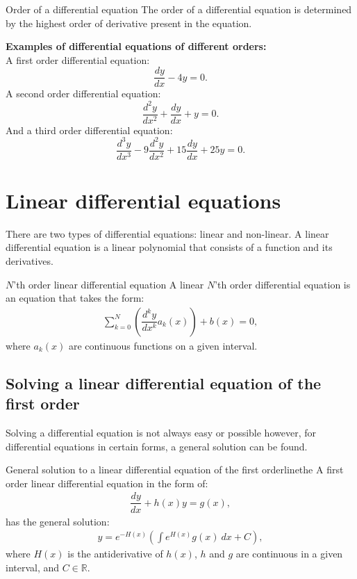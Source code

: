 \clearpage

\begin{definition}{Order of a differential equation}{}
The order of a differential equation is determined by the highest order of derivative present in the equation.
\end{definition} 

\noindent
\textbf{Examples of differential equations of different orders:}
\\
A first order differential equation:
$$\frac{dy}{dx}-4y=0. $$
A second order differential equation:
$$\frac{d^2y}{dx^2}+\frac{dy}{dx}+y = 0.$$
And a third order differential equation:
$$\frac{d^3y}{dx^3} - 9\frac{d^2y}{dx^2} + 15\frac{dy}{dx} + 25y = 0.$$

\section{Linear differential equations}
There are two types of differential equations: linear and non-linear. A linear differential equation is a linear polynomial that consists of a function and its derivatives.
\begin{definition}{$N$'th order linear differential equation}{}
A linear $N$'th order differential equation is an equation that takes the form:
\begin{align*}
\sum_{k=0}^{N}\left(\dfrac{d^ky}{dx^k}a_k(x)\right)+b(x)=0,
\end{align*}
where $a_k(x)$ are continuous functions on a given interval.
\end{definition}
\subsection{Solving a linear differential equation of the first order}
Solving  a differential equation is not always easy or possible however, for differential equations in certain forms, a general solution can be found.

\begin{theorem}{General solution to a linear differential equation of the first order}{linethe}
A first order linear differential equation in the form of:
\begin{align} \label{FODE_form}
\dfrac{dy}{dx}+h(x)y=g(x),
\end{align}
has the general solution:
\begin{align} \label{FODE_solution}
y=e^{-H(x)}\left(\int e^{H(x)}g(x)\ dx+C\right),
\end{align}
where $H(x)$ is the antiderivative of $h(x)$, $h$ and $g$ are continuous in a given interval, and $C\in \mathbb{R}$.
\end{theorem}

